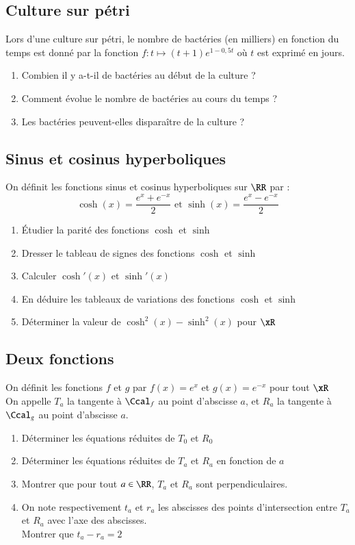 \documentclass[oneside,12pt]{article}          %
\begin{document}
\subsection{Culture sur pétri}
Lors d'une culture sur pétri, le nombre de bactéries (en milliers) en fonction du temps est donné par la fonction $f:t\mapsto(t+1)e^{1-0,5t}$ où $t$ est exprimé en jours.
\begin{enumerate}
    \item Combien il y a-t-il de bactéries au début de la culture ?
    \item Comment évolue le nombre de bactéries au cours du temps ?
    \item Les bactéries peuvent-elles disparaître de la culture ?
\end{enumerate}



\subsection{Sinus et cosinus hyperboliques}
On définit les fonctions sinus et cosinus hyperboliques sur $\RR$ par :
\[\cosh(x)=\frac{e^x+e^{-x}}{2} \text{  et  } \sinh(x)=\frac{e^x-e^{-x}}{2}\]
\begin{enumerate}
    \item Étudier la parité des fonctions $\cosh$ et $\sinh$
    \item Dresser le tableau de signes des fonctions $\cosh$ et $\sinh$
    \item Calculer $\cosh'(x)$ et $\sinh'(x)$
    \item En déduire les tableaux de variations des fonctions $\cosh$ et $\sinh$
    \item Déterminer la valeur de $\cosh^2(x)-\sinh^2(x)$ pour $\xR$
\end{enumerate}



\subsection{Deux fonctions}
On définit les fonctions $f$ et $g$ par $f(x)=e^x$ et $g(x)=e^{-x}$ pour tout $\xR$\\
On appelle $T_a$ la tangente à $\Ccal_f$ au point d'abscisse $a$, et $R_a$ la tangente à $\Ccal_g$ au point d'abscisse $a$.
\begin{enumerate}
    \item Déterminer les équations réduites de $T_0$ et $R_0$
    \item Déterminer les équations réduites de $T_a$ et $R_a$ en fonction de $a$
    \item Montrer que pour tout $a\in\RR$, $T_a$ et $R_a$ sont perpendiculaires.
    \item On note respectivement $t_a$ et $r_a$ les abscisses des points d'intersection entre $T_a$ et $R_a$ avec l'axe des abscisses.\\
    Montrer que $t_a-r_a=2$
\end{enumerate}
\end{document}
